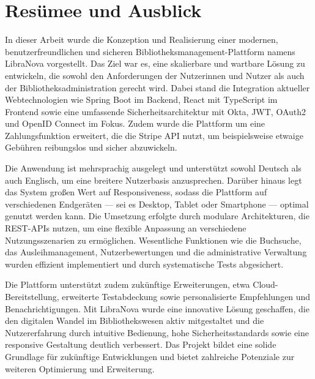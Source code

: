 \chapter{Resümee und Ausblick}

In dieser Arbeit wurde die Konzeption und Realisierung einer modernen, benutzerfreundlichen und sicheren Bibliotheksmanagement-Plattform namens LibraNova vorgestellt. Das Ziel war es, eine skalierbare und wartbare Lösung zu entwickeln, die sowohl den Anforderungen der Nutzerinnen und Nutzer als auch der Bibliotheksadministration gerecht wird. Dabei stand die Integration aktueller Webtechnologien wie Spring Boot im Backend, React mit TypeScript im Frontend sowie eine umfassende Sicherheitsarchitektur mit Okta, JWT, OAuth2 und OpenID Connect im Fokus. Zudem wurde die Plattform um eine Zahlungsfunktion erweitert, die die Stripe API nutzt, um beispielsweise etwaige Gebühren reibungslos und sicher abzuwickeln.

\noindent Die Anwendung ist mehrsprachig ausgelegt und unterstützt sowohl Deutsch als auch Englisch, um eine breitere Nutzerbasis anzusprechen. Darüber hinaus legt das System großen Wert auf Responsiveness, sodass die Plattform auf verschiedenen Endgeräten — sei es Desktop, Tablet oder Smartphone — optimal genutzt werden kann. Die Umsetzung erfolgte durch modulare Architekturen, die REST-APIs nutzen, um eine flexible Anpassung an verschiedene Nutzungsszenarien zu ermöglichen. Wesentliche Funktionen wie die Buchsuche, das Ausleihmanagement, Nutzerbewertungen und die administrative Verwaltung wurden effizient implementiert und durch systematische Tests abgesichert.

\noindent Die Plattform unterstützt zudem zukünftige Erweiterungen, etwa Cloud-Bereitstellung, erweiterte Testabdeckung sowie personalisierte Empfehlungen und Benachrichtigungen. Mit LibraNova wurde eine innovative Lösung geschaffen, die den digitalen Wandel im Bibliothekswesen aktiv mitgestaltet und die Nutzererfahrung durch intuitive Bedienung, hohe Sicherheitsstandards sowie eine responsive Gestaltung deutlich verbessert. Das Projekt bildet eine solide Grundlage für zukünftige Entwicklungen und bietet zahlreiche Potenziale zur weiteren Optimierung und Erweiterung.